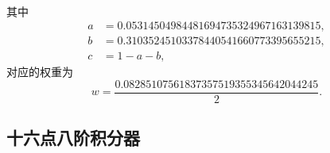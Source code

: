\begin{itemize}[wide]
\begin{equation}
\begin{gathered}
\end{gathered}
\end{equation}
其中
\begin{equation}
\begin{aligned}a & =0.05314504984481694735324967163139815,\\
b & =0.31035245103378440541660773395655215,\\
c & =1-a-b,
\end{aligned}
\end{equation}
对应的权重为
\begin{equation}
w=\frac{0.08285107561837357519355345642044245}{2}.
\end{equation}
\end{itemize}
%

\subsection{十六点八阶积分器}

